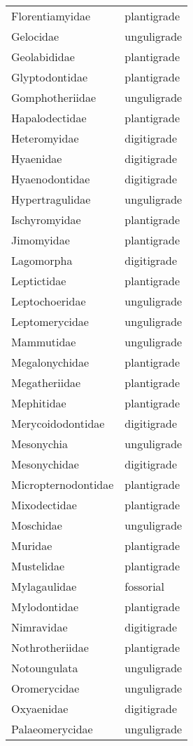 \begin{table}[ht]
\begin{tabular}{ll}
  Florentiamyidae & plantigrade \\ 
  Gelocidae & unguligrade \\ 
  Geolabididae & plantigrade \\ 
  Glyptodontidae & plantigrade \\ 
  Gomphotheriidae & unguligrade \\ 
  Hapalodectidae & plantigrade \\ 
  Heteromyidae & digitigrade \\ 
  Hyaenidae & digitigrade \\ 
  Hyaenodontidae & digitigrade \\ 
  Hypertragulidae & unguligrade \\ 
  Ischyromyidae & plantigrade \\ 
  Jimomyidae & plantigrade \\ 
  Lagomorpha & digitigrade \\ 
  Leptictidae & plantigrade \\ 
  Leptochoeridae & unguligrade \\ 
  Leptomerycidae & unguligrade \\ 
  Mammutidae & unguligrade \\ 
  Megalonychidae & plantigrade \\ 
  Megatheriidae & plantigrade \\ 
  Mephitidae & plantigrade \\ 
  Merycoidodontidae & digitigrade \\ 
  Mesonychia & unguligrade \\ 
  Mesonychidae & digitigrade \\ 
  Micropternodontidae & plantigrade \\ 
  Mixodectidae & plantigrade \\ 
  Moschidae & unguligrade \\ 
  Muridae & plantigrade \\ 
  Mustelidae & plantigrade \\ 
  Mylagaulidae & fossorial \\ 
  Mylodontidae & plantigrade \\ 
  Nimravidae & digitigrade \\ 
  Nothrotheriidae & plantigrade \\ 
  Notoungulata & unguligrade \\ 
  Oromerycidae & unguligrade \\ 
  Oxyaenidae & digitigrade \\ 
  Palaeomerycidae & unguligrade \\ 

\end{tabular}
\end{table}
